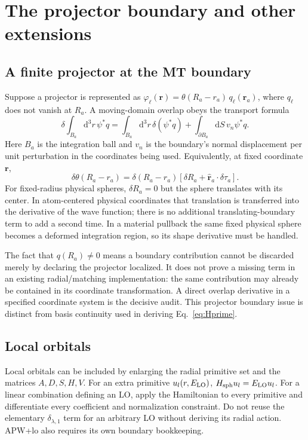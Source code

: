 \documentclass[11pt]{article}
\newcommand{\dd}{\mathrm d}
\newcommand{\newpart}[1]{\par\Needspace{12\baselineskip}\section{#1}}
\begin{document}
\newpart{The projector boundary and other extensions}
\label{sec:extensions}
\subsection{A finite projector at the MT boundary}
Suppose a projector is represented as
$\varphi_\ell(\mathbf r)=\theta(R_a-r_a)\,q_\ell(\mathbf r_a)$,
where $q_\ell$ does not vanish at $R_a$. A moving-domain overlap obeys
the transport formula
\begin{equation}
 \delta\!\int_{B_a}\dd^3r\,\psi^*q
 =\int_{B_a}\dd^3r\,\delta(\psi^*q)
   +\int_{\partial B_a}\dd S\,v_n\psi^*q.
 \label{eq:reynolds}
\end{equation}
Here $B_a$ is the integration ball and $v_n$ is the boundary's normal
displacement per unit perturbation in the coordinates being used.
Equivalently, at fixed coordinate $\mathbf r$,
\begin{equation}
 \delta\theta(R_a-r_a)=\delta(R_a-r_a)
           [\delta R_a+\widehat{\mathbf r}_a\cdot\delta\tau_a].
 \label{eq:theta}
\end{equation}
For fixed-radius physical spheres, $\delta R_a=0$ but the sphere
translates with its center. In atom-centered physical coordinates that
translation is transferred into the derivative of the wave function;
there is no additional translating-boundary term to add a second time.
In a material pullback the same fixed physical sphere becomes a
deformed integration region, so its shape derivative must be handled.

The fact that $q(R_a)\ne0$ means a boundary contribution cannot be
discarded merely by declaring the projector localized. It does not
prove a missing term in an existing radial/matching implementation:
the same contribution may already be contained in its coordinate
transformation. A direct overlap derivative in a specified coordinate
system is the decisive audit. This projector boundary issue is distinct
from basis continuity used in deriving Eq.~\eqref{eq:Hprime}.

\subsection{Local orbitals}
Local orbitals can be included by enlarging the radial primitive set and
the matrices $A,D,S,H,V$. For an extra primitive $u_l(r,E_{\rm LO})$,
$H_{\rm sph}u_l=E_{\rm LO}u_l$. For a linear combination defining an LO,
apply the Hamiltonian to every primitive and differentiate every
coefficient and normalization constraint. Do not reuse the elementary
$\delta_{\lambda,1}$ term for an arbitrary LO without deriving its
radial action. APW+lo also requires its own boundary bookkeeping.
\end{document}

